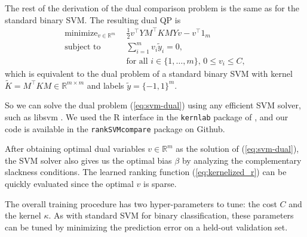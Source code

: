 \documentclass{article}
\newcommand{\RR}{\mathbb R}
\DeclareMathOperator*{\minimize}{minimize}
\begin{document}
The rest of the derivation of the dual comparison problem is the same
as for the standard binary SVM. The resulting dual QP is
\begin{equation}
  \begin{aligned}
    \label{eq:svm-dual}
    \minimize_{v\in\RR^m}\ \ &
    \frac 1 2 v^\intercal Y M^\intercal K M Y v - v^\intercal 1_m\\
    \text{subject to}\ \ &
    \sum_{i=1}^m v_i \tilde y_i = 0,\\
&    \text{for all $i\in\{1,\dots,m\}$, } 0\leq v_i\leq C,
  \end{aligned}
\end{equation}
which is equivalent to the dual problem of a standard binary SVM with
kernel $\tilde K = M^\intercal K M\in\RR^{m\times m}$ and labels
$\tilde y=\{-1,1\}^m$.

So we can solve the dual problem (\ref{eq:svm-dual}) using
any efficient SVM solver, such as libsvm \citep{libsvm}. We used the R
interface in the \texttt{kernlab} package of \citet{kernlab}, and our
code is available in the \texttt{rankSVMcompare} package on Github.

After obtaining optimal dual variables $v\in\RR^m$ as the solution of
(\ref{eq:svm-dual}), the SVM solver also gives us the optimal bias
$\beta$ by analyzing the complementary slackness conditions.  The
learned ranking function (\ref{eq:kernelized_r}) can be quickly
evaluated since the optimal $v$ is sparse.

The overall training procedure has two hyper-parameters to tune: the
cost $C$ and the kernel $\kappa$. As with standard SVM for binary
classification, these parameters can be tuned by minimizing the
prediction error on a held-out validation set.



\end{document}

